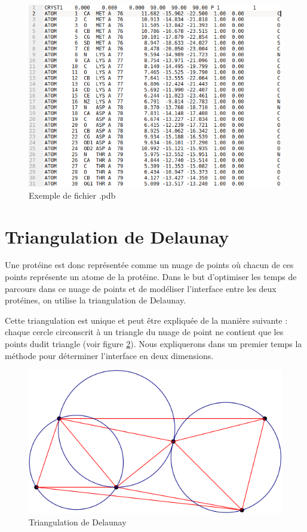 \begin{figure}[ht]
  \includegraphics[width=\textwidth]{figures/pdb_example.png}
  \caption{Exemple de fichier .pdb}
  \label{fig::pdb_file}
\end{figure}



\section{Triangulation de Delaunay}

Une protéine est donc représentée comme un nuage de points où chacun de ces points
représente un atome de la protéine. Dans le but d'optimiser les temps de parcours dans
ce nuage de points et de modéliser l'interface entre les deux protéines,
 on utilise la triangulation de Delaunay.

 Cette triangulation est unique et peut être expliquée de la manière suivante :
 chaque cercle circonscrit à un triangle du nuage de point ne contient que les points
 dudit triangle (voir figure \ref{fig::explication_delaunay}). Nous expliquerons dans un premier
 temps la méthode pour déterminer l'interface en deux dimensions.

\begin{figure}[ht]
\centering
  \includegraphics[width=\textwidth]{figures/explication_delaunay.png}
  \caption{Triangulation de Delaunay}
  \label{fig::explication_delaunay}
\end{figure}

